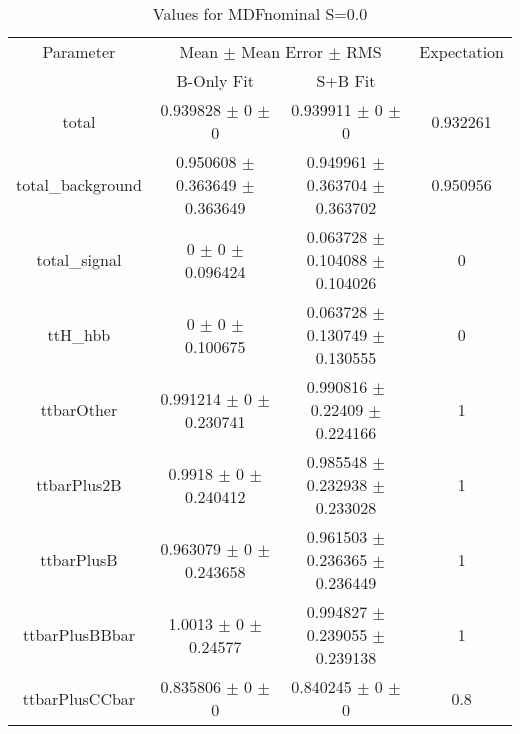 \begin{table}
\centering
\caption{Values for MDFnominal S=0.0}
\begin{tabular}{cccc}
\toprule
Parameter & \multicolumn{2}{c}{Mean $\pm$ Mean Error $\pm$ RMS} & Expectation\\
 & B-Only Fit & S+B Fit & \\
\midrule
total & \num{0.939828} $\pm$ \num{0} $\pm$ \num{0} & \num{0.939911} $\pm$ \num{0} $\pm$ \num{0} & \num{0.932261}\\
total\_background & \num{0.950608} $\pm$ \num{0.363649} $\pm$ \num{0.363649} & \num{0.949961} $\pm$ \num{0.363704} $\pm$ \num{0.363702} & \num{0.950956}\\
total\_signal & \num{0} $\pm$ \num{0} $\pm$ \num{0.096424} & \num{0.063728} $\pm$ \num{0.104088} $\pm$ \num{0.104026} & \num{0}\\
ttH\_hbb & \num{0} $\pm$ \num{0} $\pm$ \num{0.100675} & \num{0.063728} $\pm$ \num{0.130749} $\pm$ \num{0.130555} & \num{0}\\
ttbarOther & \num{0.991214} $\pm$ \num{0} $\pm$ \num{0.230741} & \num{0.990816} $\pm$ \num{0.22409} $\pm$ \num{0.224166} & \num{1}\\
ttbarPlus2B & \num{0.9918} $\pm$ \num{0} $\pm$ \num{0.240412} & \num{0.985548} $\pm$ \num{0.232938} $\pm$ \num{0.233028} & \num{1}\\
ttbarPlusB & \num{0.963079} $\pm$ \num{0} $\pm$ \num{0.243658} & \num{0.961503} $\pm$ \num{0.236365} $\pm$ \num{0.236449} & \num{1}\\
ttbarPlusBBbar & \num{1.0013} $\pm$ \num{0} $\pm$ \num{0.24577} & \num{0.994827} $\pm$ \num{0.239055} $\pm$ \num{0.239138} & \num{1}\\
ttbarPlusCCbar & \num{0.835806} $\pm$ \num{0} $\pm$ \num{0} & \num{0.840245} $\pm$ \num{0} $\pm$ \num{0} & \num{0.8}\\
\bottomrule
\end{tabular}
\end{table}